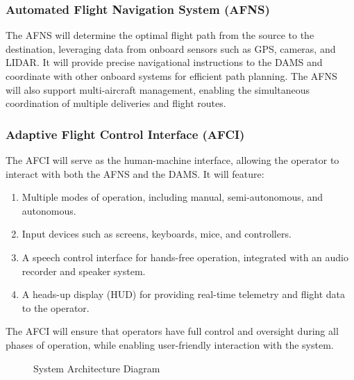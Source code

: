 \documentclass[12pt]{article}
\begin{document}
\subsubsection{Automated Flight Navigation System (AFNS)}
The AFNS will determine the optimal flight path from the source to the destination, leveraging data from onboard sensors such as GPS, cameras, and LIDAR. It will provide precise navigational instructions to the DAMS and coordinate with other onboard systems for efficient path planning. The AFNS will also support multi-aircraft management, enabling the simultaneous coordination of multiple deliveries and flight routes.

\subsubsection{Adaptive Flight Control Interface (AFCI)}
The AFCI will serve as the human-machine interface, allowing the operator to interact with both the AFNS and the DAMS. It will feature:
\begin{enumerate}
    \item Multiple modes of operation, including manual, semi-autonomous, and autonomous.
    \item Input devices such as screens, keyboards, mice, and controllers.
    \item A speech control interface for hands-free operation, integrated with an audio recorder and speaker system.
    \item A heads-up display (HUD) for providing real-time telemetry and flight data to the operator.
\end{enumerate}
The AFCI will ensure that operators have full control and oversight during all phases of operation, while enabling user-friendly interaction with the system.

\begin{figure}[H]
\centering
{}
\caption{System Architecture Diagram}
\label{fig:system-architecture}
\end{figure}
\end{document}
